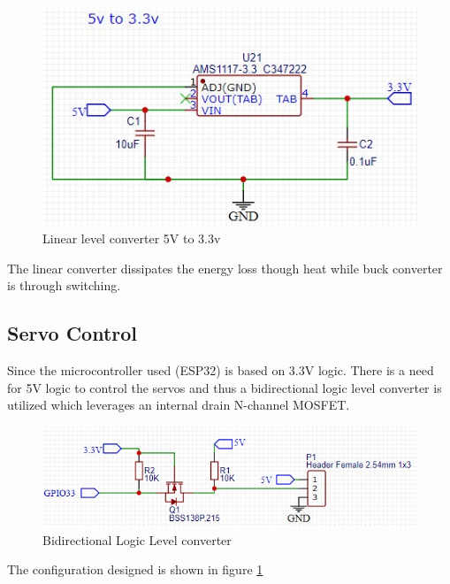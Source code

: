 \begin{center}
	\begin{figure}[H]
	\centering
	\includegraphics{Figures/5233}
	\caption[Linear Voltage Converter]{Linear level converter 5V to 3.3v}
	\end{figure}
\end{center}
The linear converter dissipates the energy loss though heat while buck converter is through switching.

\subsection{Servo Control}
Since the microcontroller used (ESP32) is based on 3.3V logic. There is a need for 5V logic to control the servos and thus a bidirectional logic level converter is utilized which leverages an internal drain N-channel MOSFET. 
\begin{center}
	\begin{figure}[H]
	\centering
	\includegraphics{Figures/logik}
	\caption[Bidirectional Logic Level converter]{Bidirectional Logic Level converter}
	\label{fig:logik}
	\end{figure}
\end{center}
The configuration designed is shown in figure \ref{fig:logik}
